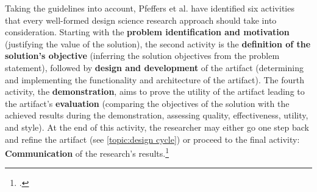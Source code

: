 Taking the guidelines into account, Pfeffers et al. have identified six activities that every well-formed design science research approach should take into consideration. Starting with the \textbf{problem identification and motivation} (justifying the value of the solution), the second activity is the \textbf{definition of the solution's objective} (inferring the solution objectives from the problem statement), followed by \textbf{design and development} of the artifact (determining and implementing the functionality and architecture of the artifact). The fourth activity, the \textbf{demonstration}, aims to prove the utility of the artifact leading to the artifact's \textbf{evaluation} (comparing the objectives of the solution with the achieved results during the demonstration, assessing quality, effectiveness, utility, and style). At the end of this activity, the researcher may either go one step back and refine the artifact (see \ref{topic:design cycle}) or proceed to the final activity: \textbf{Communication} of the research's results.\footcite[Cf.][p.12 et seqq]{PfeffersDesignScienceResearch2007}


